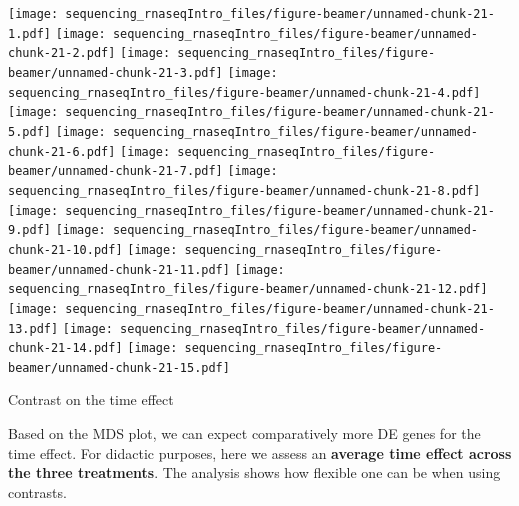 \documentclass[ignorenonframetext,]{beamer}
\newenvironment{Shaded}{\begin{snugshade}}{\end{snugshade}}
\newcommand{\ControlFlowTok}[1]{\textcolor[rgb]{0.13,0.29,0.53}{\textbf{#1}}}
\newcommand{\DataTypeTok}[1]{\textcolor[rgb]{0.13,0.29,0.53}{#1}}
\newcommand{\DecValTok}[1]{\textcolor[rgb]{0.00,0.00,0.81}{#1}}
\newcommand{\KeywordTok}[1]{\textcolor[rgb]{0.13,0.29,0.53}{\textbf{#1}}}
\newcommand{\NormalTok}[1]{#1}
\newcommand{\OperatorTok}[1]{\textcolor[rgb]{0.81,0.36,0.00}{\textbf{#1}}}
\newcommand{\StringTok}[1]{\textcolor[rgb]{0.31,0.60,0.02}{#1}}
\begin{document}
\begin{frame}[fragile]
\begin{Shaded}
\end{Shaded}

\texttt{[image: sequencing\_rnaseqIntro\_files/figure-beamer/unnamed-chunk-21-1.pdf]}
\texttt{[image: sequencing\_rnaseqIntro\_files/figure-beamer/unnamed-chunk-21-2.pdf]}
\texttt{[image: sequencing\_rnaseqIntro\_files/figure-beamer/unnamed-chunk-21-3.pdf]}
\texttt{[image: sequencing\_rnaseqIntro\_files/figure-beamer/unnamed-chunk-21-4.pdf]}
\texttt{[image: sequencing\_rnaseqIntro\_files/figure-beamer/unnamed-chunk-21-5.pdf]}
\texttt{[image: sequencing\_rnaseqIntro\_files/figure-beamer/unnamed-chunk-21-6.pdf]}
\texttt{[image: sequencing\_rnaseqIntro\_files/figure-beamer/unnamed-chunk-21-7.pdf]}
\texttt{[image: sequencing\_rnaseqIntro\_files/figure-beamer/unnamed-chunk-21-8.pdf]}
\texttt{[image: sequencing\_rnaseqIntro\_files/figure-beamer/unnamed-chunk-21-9.pdf]}
\texttt{[image: sequencing\_rnaseqIntro\_files/figure-beamer/unnamed-chunk-21-10.pdf]}
\texttt{[image: sequencing\_rnaseqIntro\_files/figure-beamer/unnamed-chunk-21-11.pdf]}
\texttt{[image: sequencing\_rnaseqIntro\_files/figure-beamer/unnamed-chunk-21-12.pdf]}
\texttt{[image: sequencing\_rnaseqIntro\_files/figure-beamer/unnamed-chunk-21-13.pdf]}
\texttt{[image: sequencing\_rnaseqIntro\_files/figure-beamer/unnamed-chunk-21-14.pdf]}
\texttt{[image: sequencing\_rnaseqIntro\_files/figure-beamer/unnamed-chunk-21-15.pdf]}

\begin{block}{Contrast on the time effect}

Based on the MDS plot, we can expect comparatively more DE genes for the
time effect. For didactic purposes, here we assess an \textbf{average
time effect across the three treatments}. The analysis shows how
flexible one can be when using contrasts.


\end{block}
\end{frame}
\end{document}
